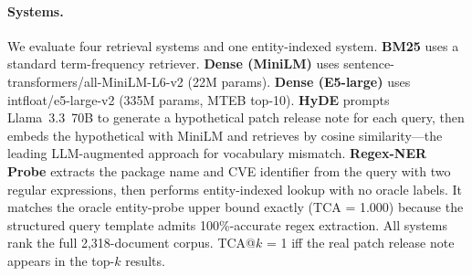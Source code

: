 \documentclass[11pt]{article}
\begin{document}
\paragraph{Systems.} We evaluate four retrieval systems and one entity-indexed system.
\textbf{BM25} uses a standard term-frequency retriever.
\textbf{Dense (MiniLM)} uses sentence-transformers/all-MiniLM-L6-v2 (22M params).
\textbf{Dense (E5-large)} uses intfloat/e5-large-v2 (335M params, MTEB top-10).
\textbf{HyDE} \cite{gao2023hyde} prompts Llama~3.3~70B to generate a hypothetical patch release note for each query, then embeds the hypothetical with MiniLM and retrieves by cosine similarity---the leading LLM-augmented approach for vocabulary mismatch.
\textbf{Regex-NER Probe} extracts the package name and CVE identifier from the query with two regular expressions, then performs entity-indexed lookup with no oracle labels. It matches the oracle entity-probe upper bound exactly (TCA = 1.000) because the structured query template admits 100\%-accurate regex extraction.
All systems rank the full 2,318-document corpus. TCA@$k$ = 1 iff the real patch release note appears in the top-$k$ results.

\begin{table}[h]
\centering
\small
{}
\caption{End-to-end retrieval on 159 real GHSA advisories (2,318-document corpus). 95\% Wilson CIs: Dense (E5-large) TCA@5 = 0.069 [0.038, 0.119]; Dense (MiniLM) TCA@5 = 0.132 [0.087, 0.194]; HyDE TCA@5 = 0.151 [0.103, 0.216]; Regex-NER Probe TCA@5 = 1.000 [0.977, 1.000]. HyDE's LLM includes the CVE identifier in 100\% of generated hypotheticals, making each hypothetical semantically closer to disclosures than to release notes; adding 70B parameters changes nothing structurally. The Regex-NER Probe matches the oracle upper bound (TCA = 1.000): entity-indexed retrieval is both the correct fix and immediately practical. Artifacts: \texttt{data/ghsa\_realworld\_results.json}; HyDE: \texttt{data/ghsa\_hyde\_results.json}.}
\label{tab:ghsa_realworld}
\end{table}
\end{document}
